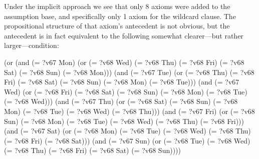 Under the implicit approach we see that only 8 axioms were added to the
assumption base, and specifically only 1 axiom for the wildcard clause. 
The propositional structure of that axiom's antecedent is not obvious, 
but the antecedent is in fact equivalent to the following 
somewhat clearer---but rather larger---condition:
\begin{tcAthena}
          (or (and (= ?v67 Mon)
                   (or (= ?v68 Wed)
                       (= ?v68 Thu)
                       (= ?v68 Fri)
                       (= ?v68 Sat)
                       (= ?v68 Sun)
                       (= ?v68 Mon)))
              (and (= ?v67 Tue)
                   (or (= ?v68 Thu)
                       (= ?v68 Fri)
                       (= ?v68 Sat)
                       (= ?v68 Sun)
                       (= ?v68 Mon)
                       (= ?v68 Tue)))
              (and (= ?v67 Wed)
                   (or (= ?v68 Fri)
                       (= ?v68 Sat)
                       (= ?v68 Sun)
                       (= ?v68 Mon)
                       (= ?v68 Tue)
                       (= ?v68 Wed)))
              (and (= ?v67 Thu)
                   (or (= ?v68 Sat)
                       (= ?v68 Sun)
                       (= ?v68 Mon)
                       (= ?v68 Tue)
                       (= ?v68 Wed)
                       (= ?v68 Thu)))
              (and (= ?v67 Fri)
                   (or (= ?v68 Sun)
                       (= ?v68 Mon)
                       (= ?v68 Tue)
                       (= ?v68 Wed)
                       (= ?v68 Thu)
                       (= ?v68 Fri)))
              (and (= ?v67 Sat)
                   (or (= ?v68 Mon)
                       (= ?v68 Tue)
                       (= ?v68 Wed)
                       (= ?v68 Thu)
                       (= ?v68 Fri)
                       (= ?v68 Sat)))
              (and (= ?v67 Sun)
                   (or (= ?v68 Tue)
                       (= ?v68 Wed)
                       (= ?v68 Thu)
                       (= ?v68 Fri)
                       (= ?v68 Sat)
                       (= ?v68 Sun))))
\end{tcAthena}


